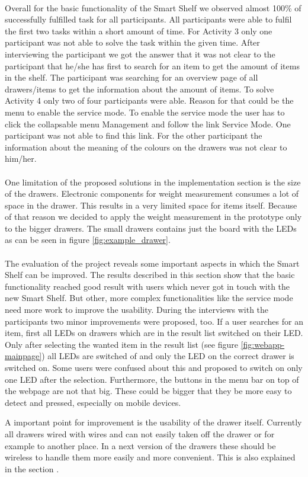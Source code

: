 \\
Overall for the basic functionality of the Smart Shelf we observed almost 100\% of successfully fulfilled task for all participants. 
All participants were able to fulfil the first two tasks within a short amount of time. 
For Activity 3 only one participant was not able to solve the task within the given time. 
After interviewing the participant we got the answer that it was not clear to the participant that he/she has first to search for an item to get the amount of items in the shelf. 
The participant was searching for an overview page of all drawers/items to get the information about the amount of items. 
To solve Activity 4 only two of four participants were able. 
Reason for that could be the menu to enable the service mode. 
To enable the service mode the user has to click the collapsable menu \grqq{}Management\grqq{} and follow the link \grqq{}Service Mode\grqq{}. 
One participant was not able to find this link. 
For the other participant the information about the meaning of the colours on the drawers was not clear to him/her. 
\\
\\
One limitation of the proposed solutions in the implementation section is the size of the drawers. 
Electronic components for weight measurement consumes a lot of space in the drawer. 
This results in a very limited space for items itself. 
Because of that reason we decided to apply the weight measurement in the prototype only to the bigger drawers. 
The small drawers contains just the board with the LEDs as can be seen in figure \ref{fig:example_drawer}. 
\\
\\
The evaluation of the project reveals some important aspects in which the Smart Shelf can be improved. 
The results described in this section show that the basic functionality reached good result with users which never got in touch with the new Smart Shelf. 
But other, more complex functionalities like the service mode need more work to improve the usability. 
During the interviews with the participants two minor improvements were proposed, too. 
If a user searches for an item, first all LEDs on drawers which are in the result list switched on their LED. 
Only after selecting the wanted item in the result list (see figure \ref{fig:webapp-mainpage}) all LEDs are switched of and only the LED on the correct drawer is switched on. 
Some users were confused about this and proposed to switch on only one LED after the selection. 
Furthermore, the buttons in the menu bar on top of the webpage are not that big. 
These could be bigger that they be more easy to detect and pressed, especially on mobile devices. 

A important point for improvement is the usability of the drawer itself. 
Currently all drawers wired with wires and can not easily taken off the drawer or for example to another place. 
In a next version of the drawers these should be wireless to handle them more easily and more convenient. 
This is also explained in the section .